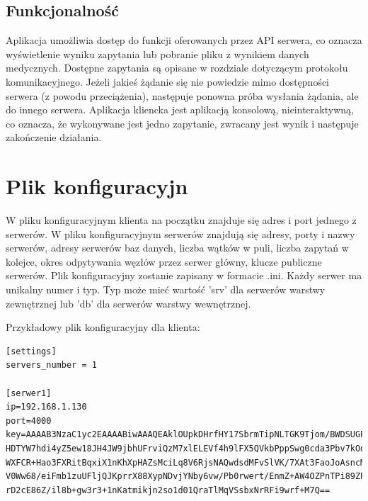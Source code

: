 \subsection{Funkcjonalność}
Aplikacja umożliwia dostęp do funkcji oferowanych przez API serwera, co oznacza wyświetlenie wyniku zapytania lub pobranie pliku z wynikiem danych medycznych. Dostępne zapytania są opisane w rozdziale dotyczącym protokołu komunikacyjnego. Jeżeli jakieś żądanie się nie powiedzie mimo dostępności serwera (z powodu przeciążenia), następuje ponowna próba wysłania żądania, ale do innego serwera.
Aplikacja kliencka jest aplikacją konsolową, nieinteraktywną, co oznacza, że wykonywane jest jedno zapytanie, zwracany jest wynik i następuje zakończenie działania.
\section{Plik konfiguracyjn}

W pliku konfiguracyjnym klienta na początku znajduje się adres i port jednego z serwerów.
W pliku konfiguracyjnym serwerów znajdują się adresy, porty i nazwy serwerów, adresy serwerów baz danych, liczba wątków w puli, liczba zapytań w kolejce, okres odpytywania węzłów przez serwer główny, klucze publiczne serwerów.
Plik konfiguracyjny zostanie zapisany w formacie .ini.
Każdy serwer ma unikalny numer i typ. Typ może mieć wartość 'srv' dla serwerów warstwy zewnętrznej lub 'db' dla serwerów warstwy wewnętrznej.

Przykładowy plik konfiguracyjny dla klienta:
\begin{lstlisting}[style=incode, caption=Plik konfiguracyjny klienta]
[settings]
servers_number = 1

[serwer1]
ip=192.168.1.130
port=4000
key=AAAAB3NzaC1yc2EAAAABiwAAAQEAklOUpkDHrfHY17SbrmTipNLTGK9Tjom/BWDSUGPl+nafzl
HDTYW7hdi4yZ5ew18JH4JW9jbhUFrviQzM7xlELEVf4h9lFX5QVkbPppSwg0cda3Pbv7kOdJ/MtyBl
WXFCR+Hao3FXRitBqxiX1nKhXpHAZsMciLq8V6RjsNAQwdsdMFvSlVK/7XAt3FaoJoAsncM1Q9x5+3
V0Ww68/eiFmb1zuUFljQJKprrX88XypNDvjYNby6vw/Pb0rwert/EnmZ+AW4OZPnTPi89ZPmVMLuay
rD2cE86Z/il8b+gw3r3+1nKatmikjn2so1d01QraTlMqVSsbxNrRFi9wrf+M7Q==
\end{lstlisting}

